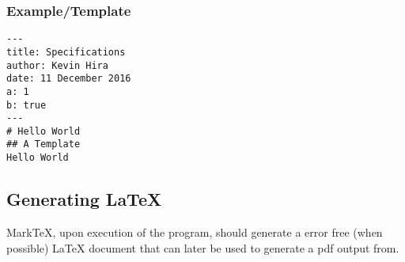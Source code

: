 \documentclass[10pt, a4paper]{article}
\begin{document}
\subsubsection{Example/Template}
\begin{verbatim}
---
title: Specifications
author: Kevin Hira
date: 11 December 2016
a: 1
b: true
---
# Hello World
## A Template
Hello World
\end{verbatim}

\subsection{Generating \LaTeX{}}
MarkTeX, upon execution of the program, should generate a error free (when possible) \LaTeX{} document that can later be used to generate a pdf output from.
\end{document}
